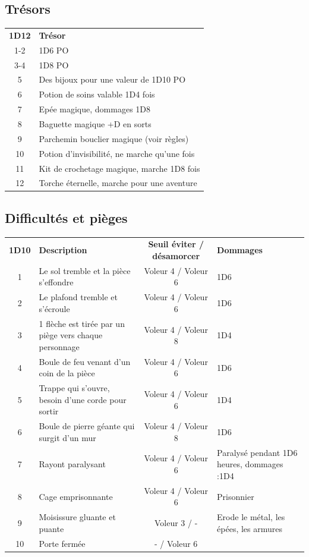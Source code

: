 \documentclass[a4paper, 11pt, twoside]{article}
\begin{document}
\subsection{Trésors}
\label{sec:org0e0fde0}

\begin{longtable}{cl}
\textbf{1D12} & \textbf{Trésor}\\
1-2 & 1D6 PO\\
3-4 & 1D8 PO\\
5 & Des bijoux pour une valeur de 1D10 PO\\
6 & Potion de soins valable 1D4 fois\\
7 & Epée magique, dommages 1D8\\
8 & Baguette magique +D en sorts\\
9 & Parchemin bouclier magique (voir règles)\\
10 & Potion d'invisibilité, ne marche qu'une fois\\
11 & Kit de crochetage magique, marche 1D8 fois\\
12 & Torche éternelle, marche pour une aventure\\
\end{longtable}

\newpage

\subsection{Difficultés et pièges}
\label{sec:org2be5a2a}

\begin{longtable}{cp{6cm}cp{4cm}}
\textbf{1D10} & \textbf{Description} & \textbf{Seuil éviter / désamorcer} & \textbf{Dommages}\\
1 & Le sol tremble et la pièce s'effondre & Voleur 4 / Voleur 6 & 1D6\\
2 & Le plafond tremble et s'écroule & Voleur 4 / Voleur 6 & 1D6\\
3 & 1 flèche est tirée par un piège vers chaque personnage & Voleur 4 / Voleur 8 & 1D4\\
4 & Boule de feu venant d'un coin de la pièce & Voleur 4 / Voleur 6 & 1D6\\
5 & Trappe qui s'ouvre, besoin d'une corde pour sortir & Voleur 4 / Voleur 6 & 1D4\\
6 & Boule de pierre géante qui surgit d'un mur & Voleur 4 / Voleur 8 & 1D6\\
7 & Rayont paralysant & Voleur 4 / Voleur 6 & Paralysé pendant 1D6 heures, dommages :1D4\\
8 & Cage emprisonnante & Voleur 4 / Voleur 6 & Prisonnier\\
9 & Moisissure gluante et puante & Voleur 3 / - & Erode le métal, les épées, les armures\\
10 & Porte fermée & - / Voleur 6 & \\
\end{longtable}
\end{document}
